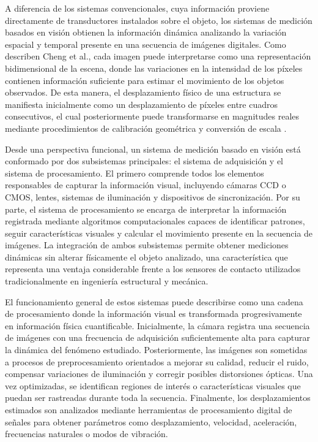 A diferencia de los sistemas convencionales, cuya información proviene directamente de transductores instalados sobre el objeto, los sistemas de medición basados en visión obtienen la información dinámica analizando la variación espacial y temporal presente en una secuencia de imágenes digitales. Como describen Cheng et al., cada imagen puede interpretarse como una representación bidimensional de la escena, donde las variaciones en la intensidad de los píxeles contienen información suficiente para estimar el movimiento de los objetos observados. De esta manera, el desplazamiento físico de una estructura se manifiesta inicialmente como un desplazamiento de píxeles entre cuadros consecutivos, el cual posteriormente puede transformarse en magnitudes reales mediante procedimientos de calibración geométrica y conversión de escala \cite{cheng2025vision}.

Desde una perspectiva funcional, un sistema de medición basado en visión está conformado por dos subsistemas principales: el sistema de adquisición y el sistema de procesamiento. El primero comprende todos los elementos responsables de capturar la información visual, incluyendo cámaras \gls{CCD} o \gls{CMOS}, lentes, sistemas de iluminación y dispositivos de sincronización. Por su parte, el sistema de procesamiento se encarga de interpretar la información registrada mediante algoritmos computacionales capaces de identificar patrones, seguir características visuales y calcular el movimiento presente en la secuencia de imágenes. La integración de ambos subsistemas permite obtener mediciones dinámicas sin alterar físicamente el objeto analizado, una característica que representa una ventaja considerable frente a los sensores de contacto utilizados tradicionalmente en ingeniería estructural y mecánica.

El funcionamiento general de estos sistemas puede describirse como una cadena de procesamiento donde la información visual es transformada progresivamente en información física cuantificable. Inicialmente, la cámara registra una secuencia de imágenes con una frecuencia de adquisición suficientemente alta para capturar la dinámica del fenómeno estudiado. Posteriormente, las imágenes son sometidas a procesos de preprocesamiento orientados a mejorar su calidad, reducir el ruido, compensar variaciones de iluminación y corregir posibles distorsiones ópticas. Una vez optimizadas, se identifican regiones de interés o características visuales que puedan ser rastreadas durante toda la secuencia. Finalmente, los desplazamientos estimados son analizados mediante herramientas de procesamiento digital de señales para obtener parámetros como desplazamiento, velocidad, aceleración, frecuencias naturales o modos de vibración.

